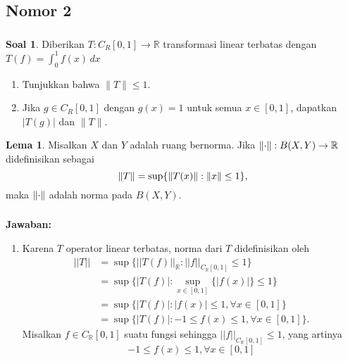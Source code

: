 \documentclass[aspectratio=169]{beamer}
\theoremstyle{definition}
\newtheorem{lema}{Lema}
\newtheorem{soal}{Soal}
\newcommand{\R}{\mathbb{R}}
\begin{document}
\subsection{Nomor 2}
\begin{frame}
  \frametitle{\insertsection}
  \begin{soal}
    Diberikan $T \colon C_R[0,1] \to \mathbb{R}$ transformasi linear terbatas dengan $T(f) = \int_0^1 f(x) \, dx$
    \begin{enumerate}
        \item Tunjukkan bahwa $\|T\| \leq 1$.
        \item Jika $g \in C_R[0,1]$ dengan $g(x) = 1$ untuk semua $x \in [0,1]$, dapatkan $|T(g)|$ dan $\|T\|$.
    \end{enumerate}
  \end{soal}
  \begin{lema}
    Misalkan \(X\) dan \(Y\) adalah ruang bernorma. Jika \(\norm{\cdot}: B(X,Y) \to \mathbb{R}\) didefinisikan sebagai
\begin{equation*}
    \norm{T} = \sup\{\norm{T(x)}:\norm{x} \leq 1\},
\end{equation*}
maka \(\norm{\cdot}\) adalah norma pada \(B(X,Y)\). 
  \end{lema}
\end{frame}


\begin{frame}
  \frametitle{\insertsection}
  \framesubtitle{\insertsubsection}
  \textbf{Jawaban:}
  \begin{enumerate}
        \item Karena $T$ operator linear terbatas, norma dari $T$ didefinisikan oleh
        \begin{align*}
            ||T||&=\sup\{||T(f)||_\R:||f||_{C_\R[0,1]}\leq1\}\\
            &=\sup\{|T(f)|:\sup_{x\in[0,1]}\{|f(x)|\}\leq1\}\\
            &=\sup\{|T(f)|:|f(x)|\leq1,\forall x\in[0,1]\}\\
            &=\sup\{|T(f)|:-1\leq f(x)\leq1,\forall x\in [0,1]\}.
        \end{align*}
        Misalkan $f\in C_\R[0,1]$ suatu fungsi sehingga $||f||_{C_\R[0,1]}\leq1$, yang artinya \[-1\leq f(x)\leq1,\forall x\in [0,1]\] 
      \end{enumerate}
\end{frame}
\end{document}
